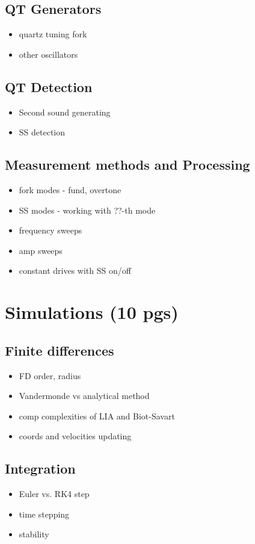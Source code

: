 \documentclass[a4paper, 12pt]{report}
\newcommand{\<}{\langle} %
\renewcommand{\>}{\rangle} %
\begin{document}
\section{QT Generators}
\begin{itemize}
	\item quartz tuning fork
	\item other oscillators
\end{itemize}

\section{QT Detection}
\begin{itemize}
	\item Second sound generating
	\item SS detection
\end{itemize}

\section{Measurement methods and Processing}
\begin{itemize}
	\item fork modes - fund, overtone
	\item SS modes - working with ??-th mode
	\item frequency sweeps
	\item amp sweeps
	\item constant drives with SS on/off
\end{itemize}

\newpage

\chapter{Simulations (10 pgs)}

\section{Finite differences}
\begin{itemize}
	\item FD order, radius
	\item Vandermonde vs analytical method
	\item comp complexities of LIA and Biot-Savart
	\item coords and velocities updating
\end{itemize}

\section{Integration }
\begin{itemize}
	\item Euler vs. RK4 step
	\item time stepping
	\item stability
\end{itemize}
\end{document}
